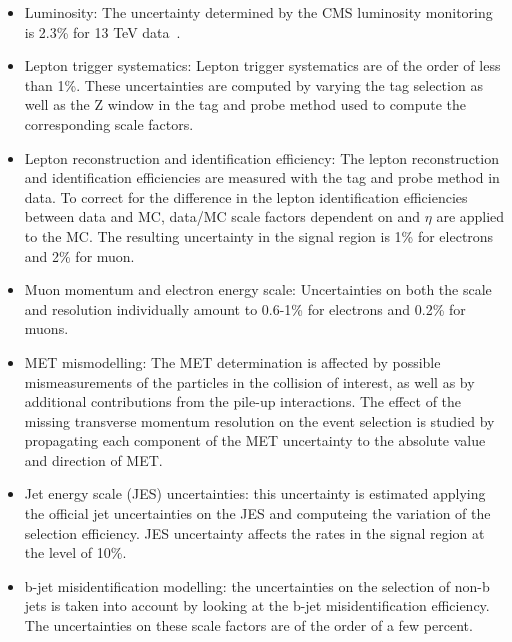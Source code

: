 \begin{itemize}
\item Luminosity: The uncertainty determined by the CMS luminosity monitoring is 2.3\% for 13 TeV data~\cite{CMS-PAS-LUM-17-001}.
\item Lepton trigger systematics: Lepton trigger systematics are of the order of less than 1\%. 
These uncertainties are computed by varying the tag selection
as well as the Z window in the tag and probe method used to compute the corresponding scale factors.
\item Lepton reconstruction and identification efficiency:
The lepton reconstruction and identification efficiencies are measured with the tag
and probe method in data. To correct for the difference in the lepton identification
efficiencies between data and MC, data/MC scale factors dependent on \pt and $\eta$ are
applied to the MC. The resulting uncertainty in the signal region is  1\% for electrons
and 2\% for muon.
\item Muon momentum and electron energy scale:  Uncertainties on both the scale and resolution individually amount to  0.6-1\% for electrons 
and  0.2\% for muons. 

\item MET mismodelling: The MET determination is affected by possible mismeasurements of the particles in the collision of interest, 
as well as by additional contributions from the pile-up interactions. The effect of the missing transverse momentum resolution on the event selection is studied by propagating each component of the MET uncertainty to the absolute value and direction of MET.

\item Jet energy scale (JES) uncertainties: this uncertainty is estimated 
applying the official jet uncertainties on the JES  and computeing the variation of the selection efficiency. JES uncertainty affects the
rates in the signal region at the level of  10\%.

\item b-jet misidentification modelling: the uncertainties on the selection of non-b jets is taken into account by looking at
the b-jet misidentification efficiency. The uncertainties on these scale factors are of the
order of a few percent.
\end{itemize}


